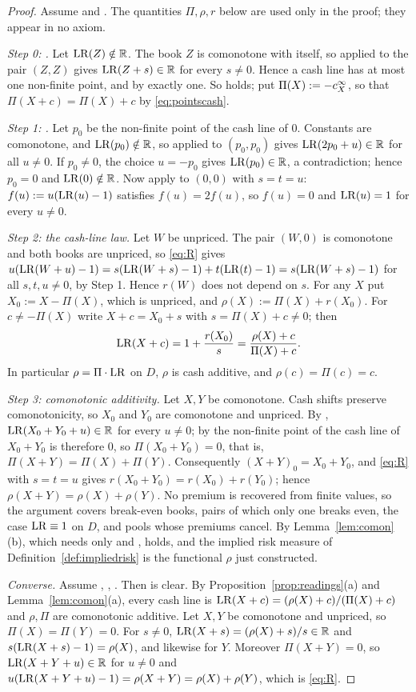 \begin{proof}
Assume \axPe{} and \axR. The quantities $\Pi,\rho,r$ below are used only in the proof; they appear in no axiom.

\emph{Step 0: \axP.} Let $\mathrm{LR}(Z)\notin\mathbb R$. The book $Z$ is comonotone with itself, so \axR{} applied to the pair
$(Z,Z)$ gives $\mathrm{LR}(Z+s)\in\mathbb R$ for every $s\ne0$. Hence a cash line has at most one non-finite point, and by \axPe{}
exactly one. So \axP{} holds; put $\Pi(X):=-c^{\infty}_{X}$, so that $\Pi(X+c)=\Pi(X)+c$ by \eqref{eq:pointscash}.

\emph{Step 1: \axN.} Let $p_0$ be the non-finite point of the cash line of $0$. Constants are comonotone, and
$\mathrm{LR}(p_0)\notin\mathbb R$, so \axR{} applied to $(p_0,p_0)$ gives $\mathrm{LR}(2p_0+u)\in\mathbb R$ for all $u\ne0$. If $p_0\ne0$, the choice
$u=-p_0$ gives $\mathrm{LR}(p_0)\in\mathbb R$, a contradiction; hence $p_0=0$ and $\mathrm{LR}(0)\notin\mathbb R$. Now apply \axR{} to $(0,0)$ with
$s=t=u$: $f(u):=u(\mathrm{LR}(u)-1)$ satisfies $f(u)=2f(u)$, so $f(u)=0$ and $\mathrm{LR}(u)=1$ for every $u\ne0$.

\emph{Step 2: the cash-line law.} Let $W$ be unpriced. The pair $(W,0)$ is comonotone and both books are unpriced,
so \eqref{eq:R} gives $u(\mathrm{LR}(W+u)-1)=s(\mathrm{LR}(W+s)-1)+t(\mathrm{LR}(t)-1)=s(\mathrm{LR}(W+s)-1)$ for all $s,t,u\ne0$, by Step 1. Hence
$r(W)$ does not depend on $s$. For any $X$ put $X_0:=X-\Pi(X)$, which is unpriced, and $\rho(X):=\Pi(X)+r(X_0)$. For
$c\ne-\Pi(X)$ write $X+c=X_0+s$ with $s=\Pi(X)+c\ne0$; then
\[
 \mathrm{LR}(X+c)=1+\frac{r(X_0)}{s}=\frac{\rho(X)+c}{\Pi(X)+c}.
\]
In particular $\rho=\Pi\cdot\mathrm{LR}$ on $D$, $\rho$ is cash additive, and $\rho(c)=\Pi(c)=c$.

\emph{Step 3: comonotonic additivity.} Let $X,Y$ be comonotone. Cash shifts preserve comonotonicity, so $X_0$ and
$Y_0$ are comonotone and unpriced. By \axR, $\mathrm{LR}(X_0+Y_0+u)\in\mathbb R$ for every $u\ne0$; by \axP{} the non-finite point of
the cash line of $X_0+Y_0$ is therefore $0$, so $\Pi(X_0+Y_0)=0$, that is, $\Pi(X+Y)=\Pi(X)+\Pi(Y)$. Consequently
$(X+Y)_0=X_0+Y_0$, and \eqref{eq:R} with $s=t=u$ gives $r(X_0+Y_0)=r(X_0)+r(Y_0)$; hence $\rho(X+Y)=\rho(X)+\rho(Y)$.
No premium is recovered from finite values, so the argument covers break-even books, pairs of which only one
breaks even, the case $\mathrm{LR}\equiv1$ on $D$, and pools whose premiums cancel. By Lemma~\ref{lem:comon}(b), which needs
only \axP{} and \axN, \axCM{} holds, and the implied risk measure of Definition~\ref{def:impliedrisk} is the
functional $\rho$ just constructed.

\emph{Converse.} Assume \axP, \axN, \axCM. Then \axPe{} is clear. By Proposition~\ref{prop:readings}(a) and
Lemma~\ref{lem:comon}(a), every cash line is $\mathrm{LR}(X+c)=(\rho(X)+c)/(\Pi(X)+c)$ and $\rho,\Pi$ are comonotonic
additive. Let $X,Y$ be comonotone and unpriced, so $\Pi(X)=\Pi(Y)=0$. For $s\ne0$, $\mathrm{LR}(X+s)=(\rho(X)+s)/s\in\mathbb R$ and
$s(\mathrm{LR}(X+s)-1)=\rho(X)$, and likewise for $Y$. Moreover $\Pi(X+Y)=0$, so $\mathrm{LR}(X+Y+u)\in\mathbb R$ for $u\ne0$ and
$u(\mathrm{LR}(X+Y+u)-1)=\rho(X+Y)=\rho(X)+\rho(Y)$, which is \eqref{eq:R}. \qedhere
\end{proof}

